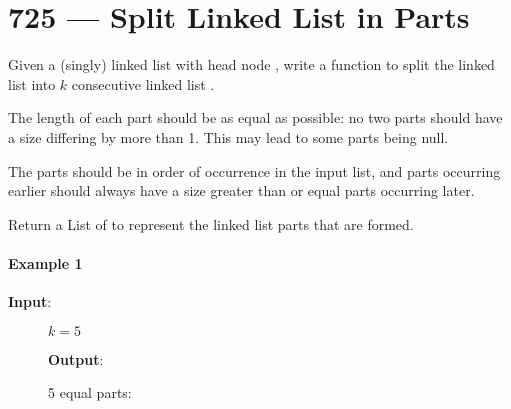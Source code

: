 \section{725 --- Split Linked List in Parts}
Given a (singly) linked list with head node , write a function to split the linked list into $k$ consecutive linked list .

The length of each part should be as equal as possible: no two parts should have a size differing by more than 1. This may lead to some parts being null.

The parts should be in order of occurrence in the input list, and parts occurring earlier should always have a size greater than or equal parts occurring later.

Return a List of  to represent the linked list parts that are formed.

\paragraph{Example 1} 
\begin{flushleft}
\textbf{Input}:

\begin{figure}[H]

$k = 5$

\textbf{Output}:

5 equal parts: \fcj{[[1], [2], [3], [4], null]}

\end{figure}
\end{flushleft}

